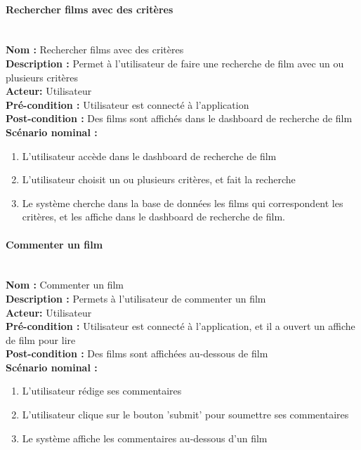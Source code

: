 \documentclass[12pt]{article}
\begin{document}
\paragraph{Rechercher films avec des critères}
\leavevmode \\
\textbf{Nom :} Rechercher films avec des critères\\
\textbf{Description :} Permet à l'utilisateur de faire une recherche de film avec un ou plusieurs critères \\
\textbf{Acteur: } Utilisateur\\
\textbf{Pré-condition : } Utilisateur est connecté à l'application\\
\textbf{Post-condition : } Des films sont affichés dans le dashboard de recherche de film\\
\textbf{Scénario nominal : }
\begin{enumerate}
    \item L'utilisateur accède dans le dashboard de recherche de film
    \item L'utilisateur choisit un ou plusieurs critères, et fait la recherche
    \item Le système cherche dans la base de données les films qui correspondent les critères, et les affiche dans le dashboard de recherche de film.
\end{enumerate}


\paragraph{Commenter un film}
\leavevmode \\
\textbf{Nom :} Commenter un film\\
\textbf{Description :} Permets à l'utilisateur de commenter un film \\
\textbf{Acteur: } Utilisateur\\
\textbf{Pré-condition : } Utilisateur est connecté à l'application, et il a ouvert un affiche de film pour lire\\
\textbf{Post-condition : } Des films sont affichées au-dessous de film\\
\textbf{Scénario nominal : }
\begin{enumerate}
    \item L'utilisateur rédige ses commentaires
    \item L'utilisateur clique sur le bouton 'submit' pour soumettre ses commentaires
    \item Le système affiche les commentaires au-dessous d'un film
\end{enumerate}
\end{document}
